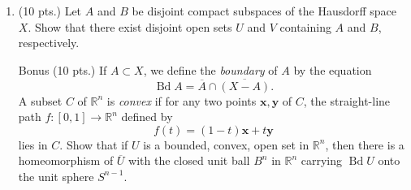 \documentclass[12pt]{report}
\newcommand{\ra}{\rightarrow}
\newcommand{\cl}[1]{\overline{#1}}
\newcommand{\R}{\mathbb{R}}
\DeclareMathOperator{\Bd}{Bd}
\begin{document}
\begin{enumerate}
    \item (10 pts.) Let \(A\) and \(B\) be disjoint compact subspaces of the Hausdorff space \(X\). Show that there exist disjoint open sets \(U\) and \(V\) containing \(A\) and \(B\), respectively.

    \item[Bonus] (10 pts.) If \(A \subset X\), we define the \textit{boundary} of \(A\) by the equation
        \[
            \Bd A = \cl{A} \cap \cl{(X - A)}.
        \]
        A subset \(C\) of \(\R^n\) is \textit{convex} if for any two points \(\mathbf{x}, \mathbf{y}\) of \(C\), the straight-line path \(f : [0, 1] \ra \R^n\) defined by
        \[
            f(t) = (1 - t) \mathbf{x} + t \mathbf{y}
        \]
        lies in \(C\). Show that if \(U\) is a bounded, convex, open set in \(\R^n\), then there is a homeomorphism of \(\cl{U}\) with the closed unit ball \(B^n\) in \(\R^n\) carrying \(\Bd U\) onto the unit sphere \(S^{n - 1}\).
\end{enumerate}
\end{document}
